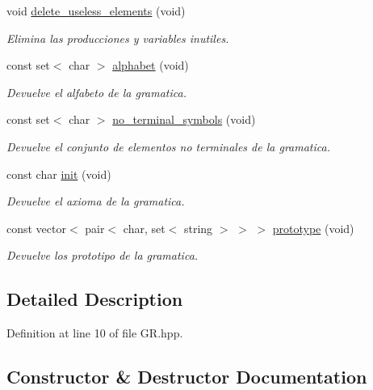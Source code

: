 \begin{DoxyCompactItemize}
void \hyperlink{class_g_r_ae186a3913a607f9a54a5a6dea201f9bb}{delete\+\_\+useless\+\_\+elements} (void)
\begin{DoxyCompactList}\small\item\em Elimina las producciones y variables inutiles. \end{DoxyCompactList}\item 
const set$<$ char $>$ \hyperlink{class_g_r_a316145725ac4ad4acbf7fe9a3f4740bb}{alphabet} (void)
\begin{DoxyCompactList}\small\item\em Devuelve el alfabeto de la gramatica. \end{DoxyCompactList}\item 
const set$<$ char $>$ \hyperlink{class_g_r_af5fb76fc7774b978e72bbebf58a81f01}{no\+\_\+terminal\+\_\+symbols} (void)
\begin{DoxyCompactList}\small\item\em Devuelve el conjunto de elementos no terminales de la gramatica. \end{DoxyCompactList}\item 
const char \hyperlink{class_g_r_a9779d42d63d7a71b30cbf1e7ccb09807}{init} (void)
\begin{DoxyCompactList}\small\item\em Devuelve el axioma de la gramatica. \end{DoxyCompactList}\item 
const vector$<$ pair$<$ char, set$<$ string $>$ $>$ $>$ \hyperlink{class_g_r_abd4f3481e903edec7b905457e0aadb4b}{prototype} (void)
\begin{DoxyCompactList}\small\item\em Devuelve los prototipo de la gramatica. \end{DoxyCompactList}\end{DoxyCompactItemize}


\subsection{Detailed Description}


Definition at line 10 of file G\+R.\+hpp.



\subsection{Constructor \& Destructor Documentation}
\mbox{\label{class_g_r_a1e1fb0154f48d7787c58965d144edce0}} 

